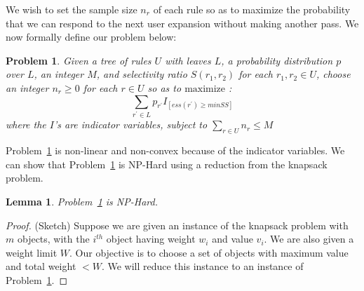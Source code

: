 \documentclass[10pt,journal,compsoc]{IEEEtran}
\newtheorem{lemma}{Lemma}
\newcounter{prob}
\newtheorem{problem}[prob]{Problem}
\begin{document}
{We wish to set the sample size $n_r$ of each rule so as to maximize the probability that we can respond to the next user expansion without making another pass. We now formally define our problem below:
\begin{problem}\label{prob:sample-sizes}
Given a tree of rules $U$ with leaves $L$, a probability distribution $p$ over $L$, an integer $M$, and selectivity ratio $S(r_1, r_2)$ for each $r_1, r_2 \in U$, 
choose an integer $n_r \geq 0$ for each $r \in U$ so as to $\textrm{maximize}$ :
$$\sum_{r^{\prime} \in L} p_{r^{\prime}}I_{[ess(r^{\prime}) \geq minSS]}$$
where the $I$'s are indicator variables, subject to
$\sum_{r \in U} n_r \leq M$
\end{problem}
Problem~\ref{prob:sample-sizes} is non-linear and non-convex because of the indicator variables. 
We can show that Problem~\ref{prob:sample-sizes} is {\sc NP-Hard} using a reduction from the knapsack problem. 
\begin{lemma}\label{lemma:sampling-hardness}
Problem~\ref{prob:sample-sizes} is {\sc NP-Hard}.
\end{lemma}
\begin{proof}(Sketch)
Suppose we are given an instance of the knapsack problem with $m$ objects, with the $i^{th}$ object having weight $w_i$ and value $v_i$. We are also given a weight limit $W$. Our objective is to choose a set of objects with maximum value and total weight $< W$. We will reduce this instance to an instance of Problem~\ref{prob:sample-sizes}.


\end{proof}}
\end{document}
